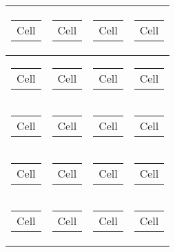 \begin{longtable}{|l|l|l|l|}
\begin{tabular}[c]{@{}l@{}} Cell \end{tabular} &
\begin{tabular}[c]{@{}l@{}} Cell \end{tabular} &
\begin{tabular}[c]{@{}l@{}} Cell \end{tabular} & 
\begin{tabular}[c]{@{}l@{}} Cell \end{tabular} \\ \hline

\begin{tabular}[c]{@{}l@{}} Cell \end{tabular} &
\begin{tabular}[c]{@{}l@{}} Cell \end{tabular} &
\begin{tabular}[c]{@{}l@{}} Cell \end{tabular} & 
\begin{tabular}[c]{@{}l@{}} Cell \end{tabular} \\ \hline

\begin{tabular}[c]{@{}l@{}} Cell \end{tabular} &
\begin{tabular}[c]{@{}l@{}} Cell \end{tabular} &
\begin{tabular}[c]{@{}l@{}} Cell \end{tabular} & 
\begin{tabular}[c]{@{}l@{}} Cell \end{tabular} \\ \hline

\begin{tabular}[c]{@{}l@{}} Cell \end{tabular} &
\begin{tabular}[c]{@{}l@{}} Cell \end{tabular} &
\begin{tabular}[c]{@{}l@{}} Cell \end{tabular} & 
\begin{tabular}[c]{@{}l@{}} Cell \end{tabular} \\ \hline

\begin{tabular}[c]{@{}l@{}} Cell \end{tabular} &
\begin{tabular}[c]{@{}l@{}} Cell \end{tabular} &
\begin{tabular}[c]{@{}l@{}} Cell \end{tabular} & 
\begin{tabular}[c]{@{}l@{}} Cell \end{tabular} \\ \hline


\end{longtable}
